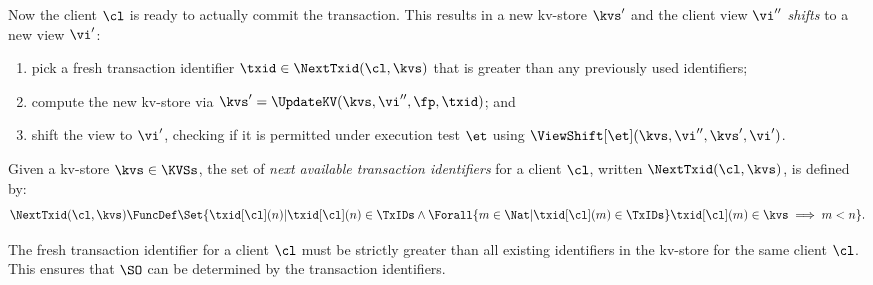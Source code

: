 Now the client \(\cl\) is ready to actually commit the transaction.
This results in a new kv-store \(\kvs'\) and the client view \(\vi''\) \emph{shifts} to a new view \(\vi'\): 
\begin{enumerate}
    \item pick a fresh transaction identifier \(\txid \in \NextTxid(\cl, \kvs)\) that is greater than any previously used identifiers;
    \item compute the new kv-store via \(\kvs' = \UpdateKV(\kvs, \vi'', \fp, \txid)\); and 
    \item shift the view to \( \vi' \), checking if it is permitted under execution test \(\et\) 
            using \(\ViewShift[\et](\kvs,\vi'',\kvs',\vi')\). 
\end{enumerate}

\begin{definition}
\label{def:next-txid}
Given a kv-store \( \kvs \in \KVSs \), 
the set of \emph{next available transaction identifiers} for a client \( \cl \),
written \( \NextTxid(\cl,\kvs)\),
is defined by:
\[ 
    \NextTxid(\cl,\kvs) \FuncDef 
    \Set{ \txid[\cl](n) | \txid[\cl](n) \in \TxIDs 
            \land \Forall{m \in \Nat | \txid[\cl](m) \in \TxIDs}
            \txid[\cl](m) \in \kvs 
            \implies m < n }. 
\]
\end{definition}

The fresh transaction identifier for a client \( \cl \) must be strictly greater than 
all existing identifiers in the kv-store for the same client \( \cl \).
This ensures that 
\( \SO \) can be determined by the transaction identifiers.

